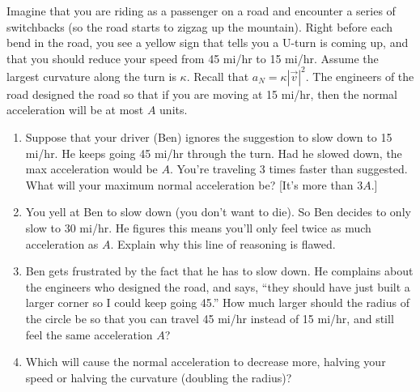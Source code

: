 \begin{problem}
 Imagine that you are riding as a passenger on a road and encounter a series of switchbacks (so the road starts to zigzag up the mountain). Right before each bend in the road, you see a yellow sign that tells you a U-turn is coming up, and that you should reduce your speed from 45 mi/hr to 15 mi/hr.  Assume the largest curvature along the turn is $\kappa$. Recall that $a_N=\kappa |\vec v|^2$. The engineers of the road designed the road so that if you are moving at 15 mi/hr, then the normal acceleration will be at most $A$ units. 
\begin{enumerate}
 \item Suppose that your driver (Ben) ignores the suggestion to slow down to 15 mi/hr.  He keeps going 45 mi/hr through the turn. Had he slowed down, the max acceleration would be $A$.  You're traveling 3 times faster than suggested.  What will your maximum normal acceleration be? [It's more than $3A$.]
 \item You yell at Ben to slow down (you don't want to die). So Ben decides to only slow to 30 mi/hr. He figures this means you'll only feel twice as much acceleration as $A$.  Explain why this line of reasoning is flawed.
 \item Ben gets frustrated by the fact that he has to slow down. He complains about the engineers who designed the road, and says, ``they should have just built a larger corner so I could keep going 45.''  How much larger should the radius of the circle be so that you can travel 45 mi/hr instead of 15 mi/hr, and still feel the same acceleration $A$?
 \item Which will cause the normal acceleration to decrease more, halving your speed or halving the curvature (doubling the radius)?
\end{enumerate}
\end{problem}



